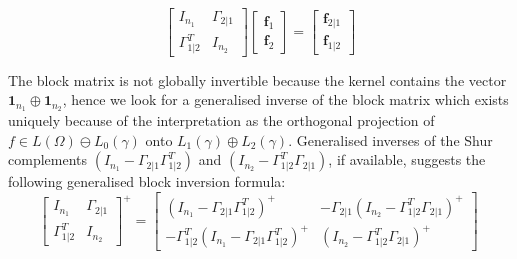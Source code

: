 \documentclass[runningheads]{llncs}
\begin{document}
\begin{equation}
\label{eq:block}
  \begin{bmatrix}
    I_{n_1} & \Gamma_{2|1} \\ \Gamma_{1|2}^T & I_{n_2}
  \end{bmatrix}
  \begin{bmatrix}
    \bm f_1 \\ \bm f_2
  \end{bmatrix}
=
\begin{bmatrix}
  \bm f_{2|1} \\ \bm f_{1|2}
\end{bmatrix}
\end{equation}

The block matrix is not globally invertible because the kernel contains the vector $\bm 1 _{n_1} \oplus \bm 1_{n_2}$, hence we look for a generalised inverse of the block matrix  which  exists uniquely because of the interpretation as the orthogonal projection of $f \in L(\Omega) \ominus L_0(\gamma)$ onto $L_1(\gamma)\oplus L_2(\gamma)$. Generalised inverses of the Shur complements $(I_{n_1}-\Gamma_{2|1}\Gamma_{1|2}^T)$ and $(I_{n_2}-\Gamma_{1|2}^T\Gamma_{2|1})$, if available, suggests the following generalised block inversion formula:
%
\begin{equation}
\label{eq:blocksolve}
\begin{bmatrix}
    I_{n_1} & \Gamma_{2|1} \\ \Gamma_{1|2}^T & I_{n_2}
  \end{bmatrix} ^+ =
  \begin{bmatrix}
    (I_{n_1}-\Gamma_{2|1}\Gamma_{1|2}^T)^{+} & - \Gamma_{2|1} (I_{n_2}-\Gamma_{1|2}^T\Gamma_{2|1})^{+} \\
 - \Gamma_{1|2}^T (I_{n_1}-\Gamma_{2|1}\Gamma_{1|2}^T)^{+} & (I_{n_2}-\Gamma_{1|2}^T\Gamma_{2|1})^{+} 
\end{bmatrix} \ 
\end{equation}
\end{document}

